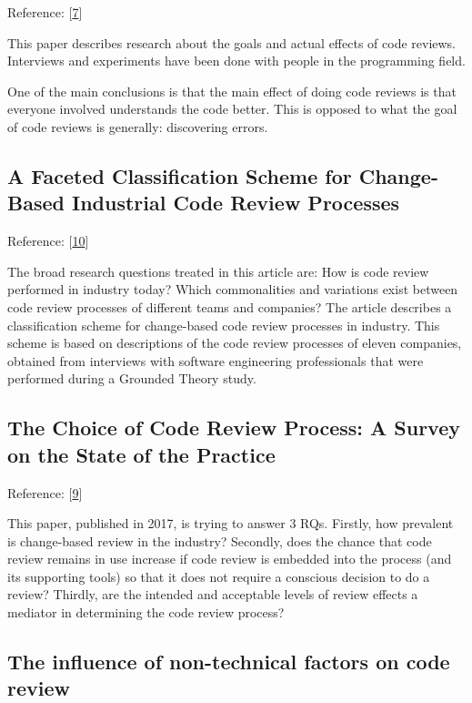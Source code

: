 \documentclass[]{book}
\begin{document}
Reference: {[}\protect\hyperlink{ref-bacchelli2013expectations}{7}{]}

This paper describes research about the goals and actual effects of code
reviews. Interviews and experiments have been done with people in the
programming field.

One of the main conclusions is that the main effect of doing code
reviews is that everyone involved understands the code better. This is
opposed to what the goal of code reviews is generally: discovering
errors.

\subsection{A Faceted Classification Scheme for Change-Based Industrial
Code Review
Processes}\label{a-faceted-classification-scheme-for-change-based-industrial-code-review-processes}

Reference: {[}\protect\hyperlink{ref-baum2016faceted}{10}{]}

The broad research questions treated in this article are: How is code
review performed in industry today? Which commonalities and variations
exist between code review processes of different teams and companies?
The article describes a classification scheme for change-based code
review processes in industry. This scheme is based on descriptions of
the code review processes of eleven companies, obtained from interviews
with software engineering professionals that were performed during a
Grounded Theory study.

\subsection{The Choice of Code Review Process: A Survey on the State of
the
Practice}\label{the-choice-of-code-review-process-a-survey-on-the-state-of-the-practice}

Reference: {[}\protect\hyperlink{ref-baum2017choice}{9}{]}

This paper, published in 2017, is trying to answer 3 RQs. Firstly, how
prevalent is change-based review in the industry? Secondly, does the
chance that code review remains in use increase if code review is
embedded into the process (and its supporting tools) so that it does not
require a conscious decision to do a review? Thirdly, are the intended
and acceptable levels of review effects a mediator in determining the
code review process?

\subsection{The influence of non-technical factors on code
review}\label{the-influence-of-non-technical-factors-on-code-review}
\end{document}
